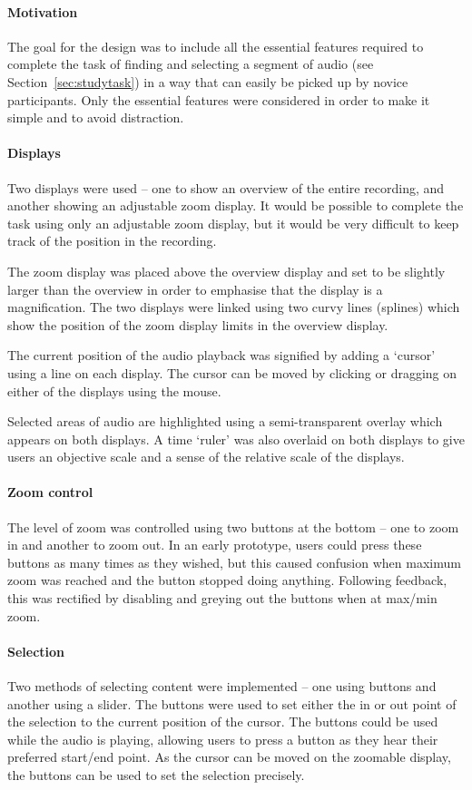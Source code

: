 \paragraph{Motivation}
The goal for the design was to include all the essential features required to complete the task of finding and
selecting a segment of audio (see Section~\ref{sec:studytask}) in a way that can easily be picked up by novice
participants. Only the essential features were considered in order to make it simple and to avoid distraction.

\paragraph{Displays}
Two displays were used -- one to show an overview of the entire recording, and another showing an adjustable zoom
display. It would be possible to complete the task using only an adjustable zoom display, but it would be very
difficult to keep track of the position in the recording.

The zoom display was placed above the overview display and set to be slightly larger than the overview in order to
emphasise that the display is a magnification. The two displays were linked using two curvy lines (splines) which show
the position of the zoom display limits in the overview display.

The current position of the audio playback was signified by adding a `cursor' using a line on each display. The cursor
can be moved by clicking or dragging on either of the displays using the mouse.

Selected areas of audio are highlighted using a semi-transparent overlay which appears on both displays.  A time
`ruler' was also overlaid on both displays to give users an objective scale and a sense of the relative scale of the
displays.

\paragraph{Zoom control}
The level of zoom was controlled using two buttons at the bottom -- one to zoom in and another to zoom out. In an early
prototype, users could press these buttons as many times as they wished, but this caused confusion when maximum zoom
was reached and the button stopped doing anything. Following feedback, this was rectified by disabling and greying out
the buttons when at max/min zoom.

\paragraph{Selection}
Two methods of selecting content were implemented -- one using buttons and another using a slider. The buttons were
used to set either the in or out point of the selection to the current position of the cursor. The buttons could be
used while the audio is playing, allowing users to press a button as they hear their preferred start/end point. As the
cursor can be moved on the zoomable display, the buttons can be used to set the selection precisely.

